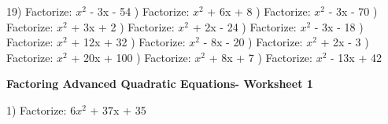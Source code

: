 \documentclass{article}%
\begin{document}
19) Factorize: $x^2$ - 3x - 54%
\newline%
\newline%
) Factorize: $x^2$ + 6x + 8%
\newline%
\newline%
) Factorize: $x^2$ - 3x - 70%
\newline%
\newline%
) Factorize: $x^2$ + 3x + 2%
\newline%
\newline%
) Factorize: $x^2$ + 2x - 24%
\newline%
\newline%
) Factorize: $x^2$ - 3x - 18%
\newline%
\newline%
) Factorize: $x^2$ + 12x + 32%
\newline%
\newline%
) Factorize: $x^2$ - 8x - 20%
\newline%
\newline%
) Factorize: $x^2$ + 2x - 3%
\newline%
\newline%
) Factorize: $x^2$ + 20x + 100%
\newline%
\newline%
) Factorize: $x^2$ + 8x + 7%
\newline%
\newline%
) Factorize: $x^2$ - 13x + 42%
\newline%
\newline%
\newline%
\pagebreak%
\large%
\begin{center}%
\textbf{Factoring Advanced Quadratic Equations- Worksheet 1}%
\newline%
\newline%
\newline%
\end{center} \normalsize%
1) Factorize: $6x^2$ + 37x + 35%
\newline%
\end{document}
